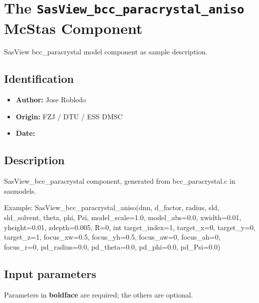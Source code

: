 \section{The \texttt{SasView\_bcc\_paracrystal\_aniso} McStas Component}
SasView bcc\_paracrystal model component as sample description.

\subsection*{Identification}
\begin{itemize}
  \item \textbf{Author:} Jose Robledo
  \item \textbf{Origin:} FZJ / DTU / ESS DMSC
  \item \textbf{Date:} 
\end{itemize}

\subsection*{Description}
SasView\_bcc\_paracrystal component, generated from bcc\_paracrystal.c in sasmodels.

Example: SasView\_bcc\_paracrystal\_aniso(dnn, d\_factor, radius, sld, sld\_solvent, theta, phi, Psi, model\_scale=1.0, model\_abs=0.0, xwidth=0.01, yheight=0.01, zdepth=0.005, R=0, int target\_index=1, target\_x=0, target\_y=0, target\_z=1, focus\_xw=0.5, focus\_yh=0.5, focus\_aw=0, focus\_ah=0, focus\_r=0, pd\_radius=0.0, pd\_theta=0.0, pd\_phi=0.0, pd\_Psi=0.0)

\subsection*{Input parameters}
Parameters in \textbf{boldface} are required; the others are optional.

